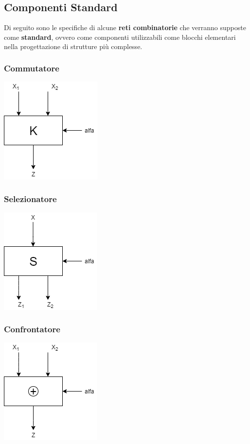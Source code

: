 \documentclass[10pt]{report}
\begin{document}
\subsection{Componenti Standard}
Di seguito sono le specifiche di alcune \textbf{reti combinatorie} che verranno supposte come \textbf{standard}, ovvero come componenti utilizzabili come blocchi elementari nella progettazione di strutture più complesse.
\subsubsection{Commutatore}
	\includegraphics[scale=0.7]{commutatore.png}
\subsubsection{Selezionatore}
	\includegraphics[scale=0.7]{selezionatore.png}
\subsubsection{Confrontatore}
	\includegraphics[scale=0.7]{confrontatore.png}
\end{document}

